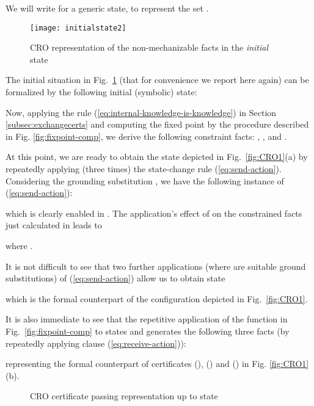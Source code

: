 \documentclass[conference]{llncs}
\newcommand{\CRO}{CRO}
\begin{document}
{We will write  for a generic state, to represent the set . 

\begin{figure}[t] 
  \centering
   \texttt{[image: initialstate2]}
  \caption{\CRO{} representation of the non-mechanizable facts  in the \textit{initial} state  }
      \label{fig:CROinit}
\end{figure}

The initial situation in Fig.~\ref{fig:CROinit} (that for convenience we report here again) can be formalized by the following initial (symbolic) state:
  
 


Now, applying the rule (\ref{eq:internal-knowledge-is-knowledge}) in Section \ref{subsec:exchangecerts} and computing the fixed point by the  procedure described in Fig. \ref{fig:fixpoint-comp}, 
we derive the following constraint facts: , , and .



 At this point, we are ready to obtain the state  depicted in Fig.~\ref{fig:CRO1}(a) by
repeatedly applying (three times) the state-change rule (\ref{eq:send-action}).
Considering the grounding substitution , we have the
  following instance of (\ref{eq:send-action}):
  
  which is clearly enabled in . The application's effect of  on the constrained facts 
  just calculated in  leads to
  
  where .
  
It is not difficult to see
  that two further applications  (where  are suitable ground substitutions) of
  (\ref{eq:send-action}) allow us to obtain state
  
  which is the formal counterpart of the configuration depicted in Fig.~\ref{fig:CRO1}.  
  
  It is also immediate to see that the repetitive application of the function  in Fig.~\ref{fig:fixpoint-comp} to states  and  generates the following three
  facts (by repeatedly applying clause (\ref{eq:receive-action})):
 
 representing the formal counterpart of certificates (), () and () in Fig. \ref{fig:CRO1}(b).

\begin{figure}[t] \center
 \qquad\qquad\qquad
{}\qquad\qquad 
\caption{\CRO{} certificate passing representation up to state  \label{fig:CRO2}}
\end{figure}

}
\end{document}
